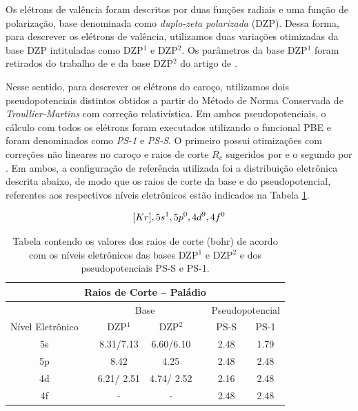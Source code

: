 Os elétrons de valência foram descritos por duas funções radiais e uma função de polarização, base denominada como \textit{duplo-zeta polarizada} (DZP). Dessa forma,  para descrever os elétrons de valência, utilizamos duas variações otimizadas da base DZP intituladas como DZP$^1$ e  DZP$^2$. Os parâmetros da base DZP$^1$ foram retirados do trabalho de \citeauthor{adrien} e da base DZP$^2$ do artigo de \citeauthor{pseudo_salvador}. 

Nesse sentido, para descrever os elétrons do caroço, utilizamos dois pseudopotenciais distintos obtidos a partir do Método de Norma Conservada de \textit{Troullier-Martins} com correção relativística. Em ambos pseudopotenciais, o cálculo com todos os elétrons foram executados utilizando o funcional PBE e foram denominados como \textit{PS-1} e \textit{PS-S}. O primeiro possui otimizações com correções não lineares no caroço e raios de corte $R_c$ sugeridos por \citeauthor{adrien} e o segundo por \citeauthor{pseudo_salvador}. Em ambos, a configuração de referência utilizada foi a distribuição eletrônica descrita abaixo, de modo que os raios de corte da base e do pseudopotencial, referentes aos respectivos níveis eletrônicos estão indicados na Tabela \ref{tab:raios_corte}.


\begin{equation}
	\bqty{Kr},5s^1,5p^0,4d^9,4f^0
\end{equation}

\begin{table}
	\centering
	\caption{Tabela contendo os valores dos raios de corte (bohr) de acordo com os níveis eletrônicos das bases DZP$ ^1 $ e DZP$ ^2 $ e dos pseudopotenciais PS-S e PS-1. \label{tab:raios_corte}}
	\begin{tabular}{clccccc} 
	\midrule\midrule
		\multicolumn{7}{c}{Raios de Corte -- Paládio}                                                        \\ 
		\midrule
		&  & \multicolumn{2}{c}{Base}            &  & \multicolumn{2}{c}{Pseudopotencial}  \\ 
		\midrule
		Nível Eletrônico &  & DZP$^{1}$ & DZP$^{2}$ &  & PS-S & PS-1                          \\ 
		\midrule
		5s               &  & 8.31/7.13        & 6.60/6.10        &  & 2.48 & 1.79                          \\
		5p               &  & 8.42             & 4.25             &  & 2.48 & 2.48                          \\
		4d               &  & 6.21/ 2.51       & 4.74/ 2.52       &  & 2.16 & 2.48                          \\
		4f               &  & -                & -                &  & 2.48 & 2.48                          \\
		\midrule\midrule
	\end{tabular}
\end{table}


